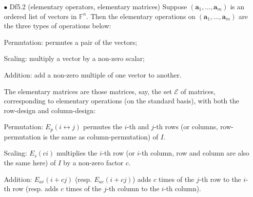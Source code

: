 \documentclass{article}
\begin{document}
\begin{Df}{$\bullet$ Df5.2 (elementary operators, elementary matrices)}
    Suppose $(\pmb{a}_1, \dots, \pmb{a}_m)$ is an ordered list of vectors in $\mathbb{F}^n$. Then the elementary operations on $(\pmb{a}_1, \dots, \pmb{a}_m)$ are the three types of operations below:
    \begin{compactenum}
        \item Permutation: permutes a pair of the vectors;
        \item Scaling: multiply a vector by a non-zero scalar;
        \item Addition: add a non-zero multiple of one vector to another.
    \end{compactenum}
    The elementary matrices are those matrices, say, the set $\mathcal{E}$ of matrices, corresponding to elementary operations (on the standard basis), with both the row-design and column-design:
    \begin{compactenum}
        \item Permutation: $E_p(i\leftrightarrow j)$ permutes the $i$-th and $j$-th rows (or columns, row-permutation is the same as column-permutation) of $I$.
        \item Scaling: $E_s(ci)$ multiplies the $i$-th row (or $i$-th column, row and column are also the same here) of $I$ by a non-zero factor $c$.
        \item Addition: $E_{ar}(i+cj)$ (resp. $E_{ac}(i+cj)$) adds $c$ times of the $j$-th row to the $i$-th row (resp. adds $c$ times of the $j$-th column to the $i$-th column).
    \end{compactenum}
\end{Df}
\end{document}
